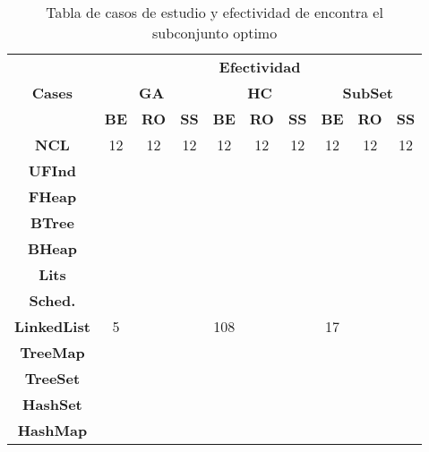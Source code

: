 \begin{table}[t]
\centering
\label{tab:t1}
\scriptsize
\begin{tabular}{|c c|ccc|ccc|ccc|}
\midrule
\multicolumn{2}{|c|}{\multirow{3}{*}{\textbf{Cases}}} & \multicolumn{9}{c|}{\textbf{Efectividad}} \\
\cline{3-11}
\multicolumn{2}{|c|}{} & \multicolumn{3}{c}{\textbf{GA}} & \multicolumn{3}{c}{\textbf{HC}} & \multicolumn{3}{c|}{\textbf{SubSet}} \\
\multicolumn{2}{|c|}{} & \textbf{\tiny{BE}} & \textbf{\tiny{RO}} & \textbf{\tiny{SS}} & \textbf{\tiny{BE}} & \textbf{\tiny{RO}} & \textbf{\tiny{SS}} & \textbf{\tiny{BE}} & \textbf{\tiny{RO}} & \textbf{\tiny{SS}}\\
\midrule
\multicolumn{2}{|c|}{\textbf{NCL}} & 12  & 12  & 12 &  12 &12 &  12&   12& 12  &  12 \\
\midrule
\multicolumn{2}{|c|}{\textbf{UFInd}}&   &   &   &   &   &   &   &   &   \\
\midrule

\multicolumn{2}{|c|}{\textbf{FHeap}} &   &   &   &   &   &   &   &   &   \\
\midrule

\multicolumn{2}{|c|}{\textbf{BTree}} &   &   &   &   &   &   &   &   &   \\
\midrule

\multicolumn{2}{|c|}{\textbf{BHeap}} &   &   &   &   &   &   &   &   &   \\
\midrule

\multicolumn{2}{|c|}{\textbf{Lits}} &   &   &   &   &   &   &   &   &   \\
\midrule

\multicolumn{2}{|c|}{\textbf{Sched.}} &   &   &   &   &   &   &   &   &   \\

\midrule
\multicolumn{2}{|c|}{\textbf{LinkedList}} &5   &   &   &  108 &  &   &  17 &   &   \\
\midrule

\multicolumn{2}{|c|}{\textbf{TreeMap}} &   &   &   &   &   &   &   &   &   \\
\midrule

\multicolumn{2}{|c|}{\textbf{TreeSet}} &   &   &   &   &   &   &   &   &   \\
\midrule

\multicolumn{2}{|c|}{\textbf{HashSet}} &   &   &   &   &   &   &   &   &   \\
\midrule

\multicolumn{2}{|c|}{\textbf{HashMap}} &   &   &   &   &   &   &   &   &   \\
\hline
\end{tabular}

\caption{Tabla de casos de estudio y efectividad de encontra el subconjunto optimo}
\label{tab:efectividad}
\end{table}

